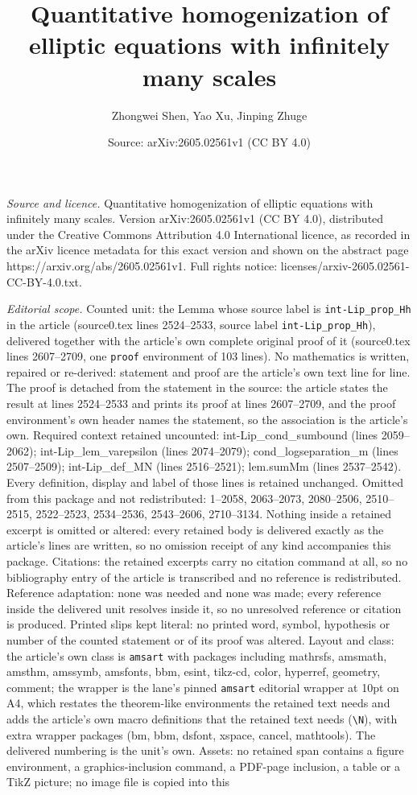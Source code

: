 \documentclass[10pt,a4paper]{amsart}
\title[Quantitative homogenization of elliptic equations with infin]{Quantitative homogenization of elliptic equations with infinitely many scales}
\author{Zhongwei Shen, Yao Xu, Jinping Zhuge}
\date{Source: arXiv:2605.02561v1 (CC BY 4.0)}
\begin{document}
\maketitle

\noindent\emph{Source and licence.} Quantitative homogenization of elliptic equations with infinitely many scales. Version arXiv:2605.02561v1 (CC BY 4.0), distributed under the Creative Commons Attribution 4.0 International licence, as recorded in the arXiv licence metadata for this exact version and shown on the abstract page https://arxiv.org/abs/2605.02561v1. Full rights notice: licenses/arxiv-2605.02561-CC-BY-4.0.txt.\par\smallskip

\noindent\textit{Editorial scope.} Counted unit: the Lemma whose source label is \texttt{int-Lip\_prop\_Hh} in the article (source0.tex lines 2524--2533, source label \texttt{int-Lip\_prop\_Hh}), delivered together with the article's own complete original proof of it (source0.tex lines 2607--2709, one \texttt{proof} environment of 103 lines). No mathematics is written, repaired or re-derived: statement and proof are the article's own text line for line. The proof is detached from the statement in the source: the article states the result at lines 2524--2533 and prints its proof at lines 2607--2709, and the proof environment's own header names the statement, so the association is the article's own. Required context retained uncounted: int-Lip\_cond\_sumbound (lines 2059--2062); int-Lip\_lem\_varepsilon (lines 2074--2079); cond\_logseparation\_m (lines 2507--2509); int-Lip\_def\_MN (lines 2516--2521); lem.sumMm (lines 2537--2542). Every definition, display and label of those lines is retained unchanged. Omitted from this package and not redistributed: 1--2058, 2063--2073, 2080--2506, 2510--2515, 2522--2523, 2534--2536, 2543--2606, 2710--3134. Nothing inside a retained excerpt is omitted or altered: every retained body is delivered exactly as the article's lines are written, so no omission receipt of any kind accompanies this package. Citations: the retained excerpts carry no citation command at all, so no bibliography entry of the article is transcribed and no reference is redistributed. Reference adaptation: none was needed and none was made; every reference inside the delivered unit resolves inside it, so no unresolved reference or citation is produced. Printed slips kept literal: no printed word, symbol, hypothesis or number of the counted statement or of its proof was altered. Layout and class: the article's own class is \texttt{amsart} with packages including mathrsfs, amsmath, amsthm, amssymb, amsfonts, bbm, esint, tikz-cd, color, hyperref, geometry, comment; the wrapper is the lane's pinned \texttt{amsart} editorial wrapper at 10pt on A4, which restates the theorem-like environments the retained text needs and adds the article's own macro definitions that the retained text needs (\texttt{\textbackslash N}), with extra wrapper packages (bm, bbm, dsfont, xspace, cancel, mathtools). The delivered numbering is the unit's own. Assets: no retained span contains a figure environment, a graphics-inclusion command, a PDF-page inclusion, a table or a TikZ picture; no image file is copied into this 
\end{document}
